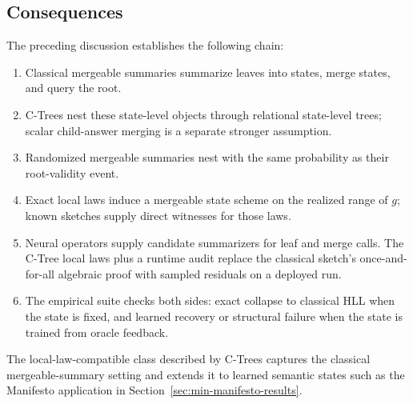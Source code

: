 \subsection{Consequences}
\label{sec:v7-what-established}

The preceding discussion establishes the following chain:
\begin{enumerate}[leftmargin=1.5em]
\item Classical mergeable summaries summarize leaves into states, merge
states, and query the root.
\item C-Trees nest these state-level objects through relational
state-level trees; scalar child-answer merging is a separate stronger
assumption.
\item Randomized mergeable summaries nest with the same probability as
their root-validity event.
\item Exact local laws induce a mergeable state scheme on the realized
range of \(g\); known sketches supply direct witnesses for those laws.
\item Neural operators supply candidate summarizers for leaf and merge
calls. The C-Tree local laws plus a runtime audit replace the classical
sketch's once-and-for-all algebraic proof with sampled residuals on a
deployed run.
\item The empirical suite checks both sides: exact collapse to
classical HLL when the state is fixed, and learned recovery or
structural failure when the state is trained from oracle feedback.
\end{enumerate}

The local-law-compatible class described by C-Trees captures the
classical mergeable-summary setting and extends it to learned semantic
states such as the Manifesto application in
Section~\ref{sec:min-manifesto-results}.
